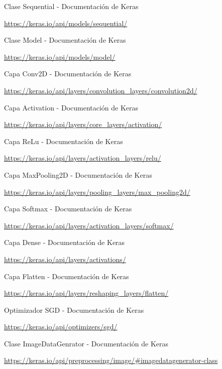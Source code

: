\documentclass[12pt, spanish]{article}
\begin{document}
\begin{thebibliography}{9}

	Clase Sequential - Documentación de Keras

	\url{https://keras.io/api/models/sequential/}



	Clase Model - Documentación de Keras

	\url{https://keras.io/api/models/model/}


	Capa Conv2D - Documentación de Keras

	\url{https://keras.io/api/layers/convolution_layers/convolution2d/}



	Capa Activation - Documentación de Keras

	\url{https://keras.io/api/layers/core_layers/activation/}


	Capa ReLu - Documentación de Keras

	\url{https://keras.io/api/layers/activation_layers/relu/}


	Capa MaxPooling2D - Documentación de Keras

	\url{https://keras.io/api/layers/pooling_layers/max_pooling2d/}


	Capa Softmax - Documentación de Keras

	\url{https://keras.io/api/layers/activation_layers/softmax/}


	Capa Dense - Documentación de Keras

	\url{https://keras.io/api/layers/activations/}


	Capa Flatten - Documentación de Keras

	\url{https://keras.io/api/layers/reshaping_layers/flatten/}


	Optimizador SGD - Documentación de Keras

	\url{https://keras.io/api/optimizers/sgd/}


	Clase ImageDataGenrator - Documentación de Keras

	\url{https://keras.io/api/preprocessing/image/#imagedatagenerator-class}



\end{thebibliography}
\end{document}
